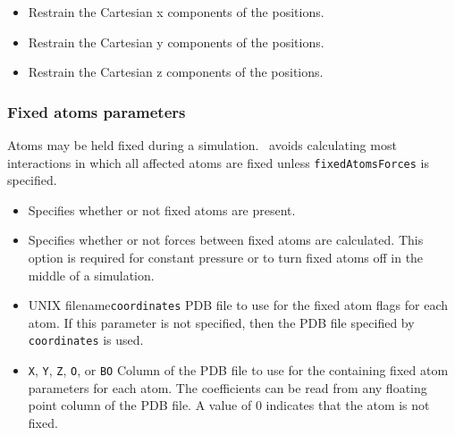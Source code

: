 \begin{itemize}
\item
{}
{Restrain the Cartesian x components of the positions.}
\item
{}
{Restrain the Cartesian y components of the positions.}
\item
{}
{Restrain the Cartesian z components of the positions.}

\end{itemize}

\subsubsection{Fixed atoms parameters}

Atoms may be held fixed during a simulation.  \NAMD\ avoids calculating most interactions in which all affected atoms are fixed unless {\tt fixedAtomsForces} is specified.

\begin{itemize}

\item
{}
{Specifies whether or not fixed atoms are present.} 

\item
{}
{Specifies whether or not forces between fixed atoms are calculated.  This option is required for constant pressure or to turn fixed atoms off in the middle of a simulation.}

\item
{}
{UNIX filename}{{\tt coordinates}}
{PDB file to use for the fixed atom flags for each atom.  
If this parameter is not specified, then 
the PDB file specified by {\tt coordinates} is used.}

\item
{}
{{\tt X}, {\tt Y}, {\tt Z}, {\tt O}, or {\tt B}}{{\tt O}} 
{Column of the PDB file to use for the containing fixed atom parameters for 
each atom.  The coefficients can be read from any 
floating point column of the PDB file.  
A value of 0 indicates that the atom is not fixed.}

\end{itemize}

